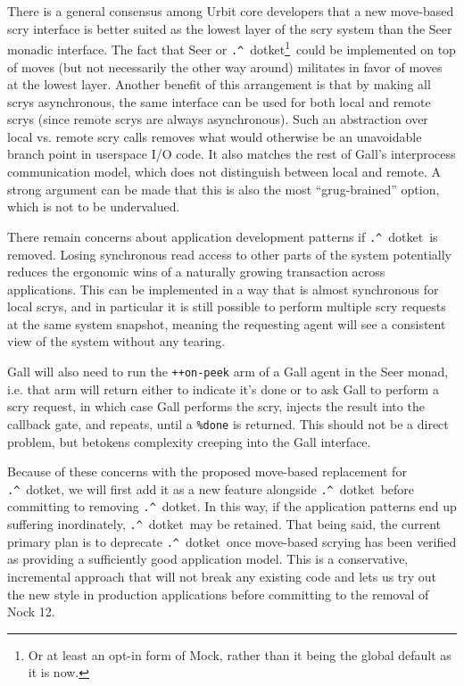 \documentclass[twoside]{article}
\newcommand{\dotket}{\texttt{\string.\string^}~dotket}
\begin{document}
There is a general consensus among Urbit core developers that a new move-based scry interface is better suited as the lowest layer of the scry system than the Seer monadic interface.  The fact that Seer or \dotket\footnote{Or at least an opt-in form of Mock, rather than it being the global default as it is now.}~could be implemented on top of moves (but not necessarily the other way around) militates in favor of moves at the lowest layer.  Another benefit of this arrangement is that by making all scrys asynchronous, the same interface can be used for both local and remote scrys (since remote scrys are always asynchronous).  Such an abstraction over local vs. remote scry calls removes what would otherwise be an unavoidable branch point in userspace I/O code.  It also matches the rest of Gall's interprocess communication model, which does not distinguish between local and remote.  A strong argument can be made that this is also the most ``grug-brained'' option, which is not to be undervalued.

There remain concerns about application development patterns if \dotket~is removed.  Losing synchronous read access to other parts of the system potentially reduces the ergonomic wins of a naturally growing transaction across applications.  This can be implemented in a way that is almost synchronous for local scrys, and in particular it is still possible to perform multiple scry requests at the same system snapshot, meaning the requesting agent will see a consistent view of the system without any tearing.

Gall will also need to run the \texttt{++on-peek} arm of a Gall agent in the Seer monad, i.e. that arm will return either \texttt{} to indicate it's done or \texttt{} to ask Gall to perform a scry request, in which case Gall performs the scry, injects the result into the callback gate, and repeats, until a \texttt{\%done} is returned.  This should not be a direct problem, but betokens complexity creeping into the Gall interface.

Because of these concerns with the proposed move-based replacement for \dotket, we will first add it as a new feature alongside \dotket~before committing to removing \dotket.  In this way, if the application patterns end up suffering inordinately, \dotket~may be retained.  That being said, the current primary plan is to deprecate \dotket~once move-based scrying has been verified as providing a sufficiently good application model.  This is a conservative, incremental approach that will not break any existing code and lets us try out the new style in production applications before committing to the removal of Nock 12.



\end{document}
